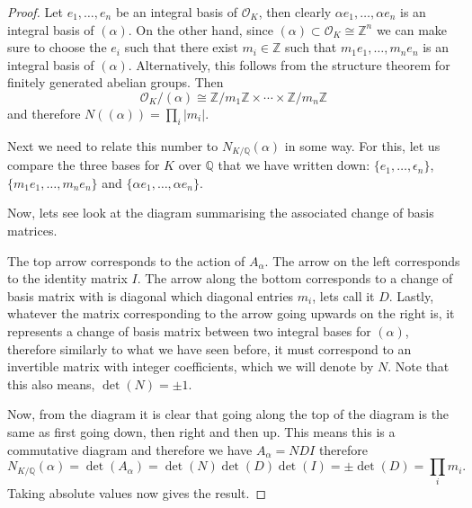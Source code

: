 \documentclass[11pt,a4paper]{report}
\theoremstyle{plain}
\theoremstyle{definition}
\theoremstyle{definition}
\newcommand{\ZZ}{\mathbb{Z}}
\def\QQ{\mathbb{Q}}
\def \a{\alpha}
\def \e {\epsilon}
\def \OO {\mathcal{O}}
\begin{document}
	\begin{proof}
		Let $e_1,\dots,e_n$ be an integral basis of $\OO_K$, then clearly $\a e_1,\dots,\a e_n$ is an integral basis of $(\a)$. On the other hand, since $(\a) \subset \OO_K \cong \ZZ^n$ we can make sure to choose the $e_i$ such that there exist $m_i \in \ZZ$ such that $m_1e_1,\dots,m_ne_n$ is an integral basis of $(\a)$. Alternatively, this follows from the structure theorem for finitely generated abelian groups.  Then \[\OO_K/(\a) \cong \ZZ/m_1\ZZ \times \cdots \times \ZZ/m_n\ZZ\] and therefore $N((\a))=\prod_i |m_i|$.
		
		Next we need to relate this number to $N_{K/\QQ}(\a)$ in some way. For this, let us compare the three bases for $K$ over $\QQ$ that we have written down: $\{e_1,\dots,\e_n\}$, $\{m_1e_1,\dots,m_ne_n\}$ and $\{\a e_1,\dots,\a e_n\}$.
		
		Now, lets see look at the diagram summarising the associated change of basis matrices.
		
		\begin{center}
		\end{center} 
		
		The top arrow corresponds to the action of $A_\a$. The arrow on the left corresponds to the identity matrix $I$. The arrow along the bottom corresponds to a change of basis matrix with is diagonal which diagonal entries $m_i$, lets call it $D$. Lastly, whatever the matrix corresponding to the arrow going upwards on the right is, it represents a change of basis matrix between two integral bases for $(\a)$, therefore  similarly to what we have seen before, it must correspond to an invertible matrix with integer coefficients, which we will denote by $N$. Note that this also means, $\det(N)=\pm 1$. 
		
		Now, from the diagram it is clear that going along the top of the diagram is the same as first going down, then right and then up. This means this is a commutative diagram and therefore we have $A_\a=NDI$ therefore \[N_{K/\QQ}(\a)=\det(A_\a)=\det(N)\det(D)\det(I)=\pm \det(D)=\prod_i m_i.\] Taking absolute values now gives the result.
	\end{proof}
	
\end{document}
